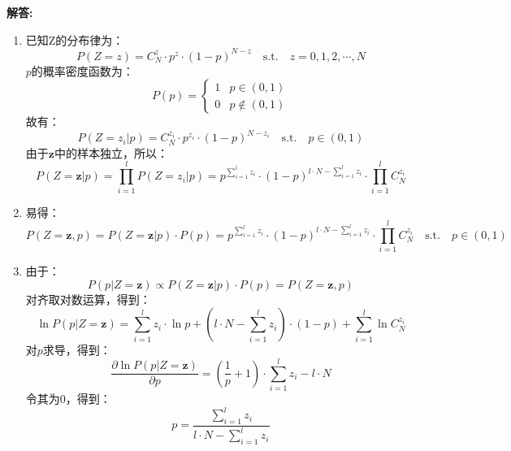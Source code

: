 \documentclass[12pt, onecolumn]{article}
\newcommand\normf{\fangsong}
\newenvironment{solution}{\par\noindent\normf\textbf{解答: }}{\leavevmode\\\par}
\begin{document}
	\begin{solution}
		\begin{enumerate}
			\item 已知Z的分布律为：
			\begin{equation*}
			P(Z=z)=C_N^z\cdot p^z\cdot\left( 1-p\right)^{N-z} \quad\mathrm{s.t.}\quad z=0,1,2,\cdots,N
			\end{equation*}
			$p$的概率密度函数为：
			\begin{equation*}
			P(p)=\begin{cases}
			1&p\in(0,1)\\
			0&p\not\in(0,1)
			\end{cases}
			\end{equation*}
			故有：
			\begin{equation*}
			P(Z=z_i\vert p)=C_N^{z_i}\cdot p^{z_i}\cdot\left( 1-p\right)^{N-{z_i}}
			\quad\mathrm{s.t.}\quad p\in(0,1)
			\end{equation*}
			由于$\boldsymbol{z}$中的样本独立，所以：
			\begin{equation*}
			P(Z=\boldsymbol{z}\vert p)=\prod_{i=1}^{l}P(Z=z_i\vert p)=
			p^{\sum_{i=1}^{l}z_i}\cdot\left( 1-p\right)^{l\cdot N-\sum_{i=1}^{l}z_i}\cdot\prod_{i=1}^{l}C_N^{z_i}
			\end{equation*}
			\item 易得：
			\begin{equation*}
			P(Z=\boldsymbol{z},p)=P(Z=\boldsymbol{z}\vert p)\cdot P(p)=
			p^{\sum_{i=1}^{l}z_i}\cdot\left( 1-p\right)^{l\cdot N-\sum_{i=1}^{l}z_i}\cdot\prod_{i=1}^{l}C_N^{z_i}
			\quad\mathrm{s.t.}\quad p\in(0,1)
			\end{equation*}
			
			\item 由于：
			\begin{equation*}
			P(p\vert Z=\boldsymbol{z})\propto P(Z=\boldsymbol{z}\vert p)\cdot P(p)=P(Z=\boldsymbol{z},p)        
			\end{equation*}
			对齐取对数运算，得到：
			\begin{equation*}
			\ln P(p\vert Z=\boldsymbol{z})=\sum_{i=1}^{l}z_i\cdot\ln p+
			\left( l\cdot N-\sum_{i=1}^{l}z_i\right) \cdot\left( 1-p\right)+
			\sum_{i=1}^{l}\ln C_N^{z_i}
			\end{equation*}
			对$p$求导，得到：
			\begin{equation*}
			\frac{\partial \ln P(p\vert Z=\boldsymbol{z})}{\partial p}=
			\left( \frac{1}{p}+1\right) \cdot\sum_{i=1}^{l}z_i-l\cdot N
			\end{equation*}
			令其为0，得到：
			\begin{equation*}
			p=\frac{\sum_{i=1}^{l}z_i}{l\cdot N-\sum_{i=1}^{l}z_i}
			\end{equation*}
		\end{enumerate}
	\end{solution}
\end{document}
